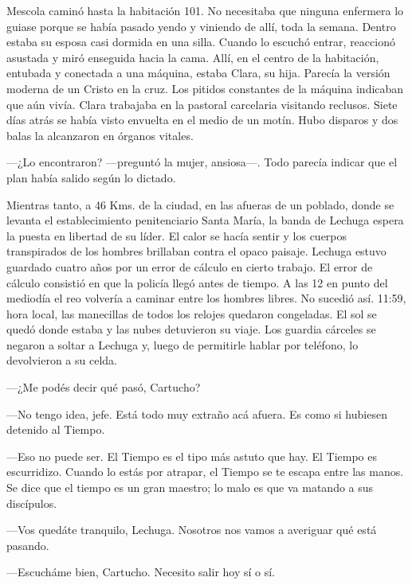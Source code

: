 \documentclass[11pt,twoside,openright,a5paper]{book}
\begin{document}
Mescola caminó hasta la habitación 101. No necesitaba que ninguna enfermera lo guiase porque se había pasado yendo y viniendo de allí, toda la semana. Dentro estaba su esposa casi dormida en una silla. Cuando lo escuchó entrar, reaccionó asustada y miró enseguida hacia la cama. Allí, en el centro de la habitación, entubada y conectada a una máquina, estaba Clara, su hija. Parecía la versión moderna de un Cristo en la cruz. Los pitidos constantes de la máquina indicaban que aún vivía. Clara trabajaba en la pastoral carcelaria visitando reclusos. Siete días atrás se había visto envuelta en el medio de un motín. Hubo disparos y dos balas la alcanzaron en órganos vitales.

---¿Lo encontraron? ---preguntó la mujer, ansiosa---. Todo parecía indicar que el plan había salido según lo dictado.

\vspace{0.5cm}

Mientras tanto, a 46 Kms. de la ciudad, en las afueras de un poblado, donde se levanta el establecimiento penitenciario Santa María, la banda de Lechuga espera la puesta en libertad de su líder. El calor se hacía sentir y los cuerpos transpirados de los hombres brillaban contra el opaco paisaje. Lechuga estuvo guardado cuatro años por un error de cálculo en cierto trabajo. El error de cálculo consistió en que la policía llegó antes de tiempo. A las 12 en punto del mediodía el reo volvería a caminar entre los hombres libres. No sucedió así. 11:59, hora local, las manecillas de todos los relojes quedaron congeladas. El sol se quedó donde estaba y las nubes detuvieron su viaje. Los guardia cárceles se negaron a soltar a Lechuga y, luego de permitirle hablar por teléfono, lo devolvieron a su celda.

---¿Me podés decir qué pasó, Cartucho?

---No tengo idea, jefe. Está todo muy extraño acá afuera. Es como si hubiesen detenido al Tiempo.

---Eso no puede ser. El Tiempo es el tipo más astuto que hay. El Tiempo es escurridizo. Cuando lo estás por atrapar, el Tiempo se te escapa entre las manos. Se dice que el tiempo es un gran maestro; lo malo es que va matando a sus discípulos.

---Vos quedáte tranquilo, Lechuga. Nosotros nos vamos a averiguar qué está pasando.

---Escucháme bien, Cartucho. Necesito salir hoy sí o sí.

\vspace{0.5cm}
\end{document}
